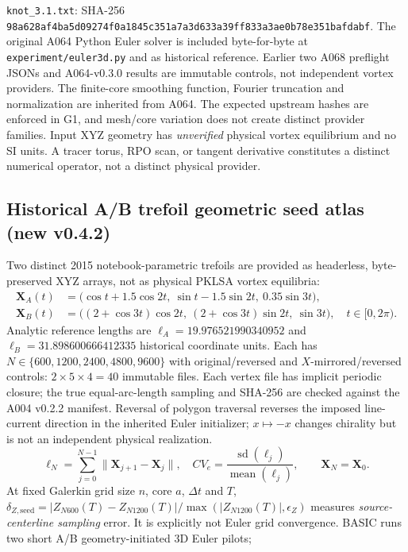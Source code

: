 \documentclass[11pt,a4paper]{article}
\begin{document}
\texttt{knot\_3.1.txt}: SHA-256 \texttt{98a628af4ba5d09274f0a1845c351a7a3d633a39ff833a3ae0b78e351bafdabf}. The original A064 Python Euler solver is included byte-for-byte at \texttt{experiment/euler3d.py} and as historical reference. Earlier two A068 preflight JSONs and A064-v0.3.0 results are immutable controls, not independent vortex providers. The finite-core smoothing function, Fourier truncation and normalization are inherited from A064. The expected upstream hashes are enforced in G1, and mesh/core variation does not create distinct provider families. Input XYZ geometry has \emph{unverified} physical vortex equilibrium and no SI units. A tracer torus, RPO scan, or tangent derivative constitutes a distinct numerical operator, not a distinct physical provider.

\subsection*{Historical A/B trefoil geometric seed atlas (new v0.4.2)}
Two distinct 2015 notebook-parametric trefoils are provided as headerless,
byte-preserved XYZ arrays, not as physical PKLSA vortex equilibria:
\begin{align}
\mathbf X_A(t)&=\bigl(\cos t+1.5\cos2t,\ \sin t-1.5\sin2t,\ 0.35\sin3t\bigr),\\
\mathbf X_B(t)&=\bigl((2+\cos3t)\cos2t,\ (2+\cos3t)\sin2t,\ \sin3t\bigr),\quad t\in[0,2\pi).
\end{align}
Analytic reference lengths are $\ell_A=19.976521990340952$ and
$\ell_B=31.898600666412335$ historical coordinate units. Each has
$N\in\{600,1200,2400,4800,9600\}$ with original/reversed and
$X$-mirrored/reversed controls: $2\times5\times4=40$ immutable files.
Each vertex file has implicit periodic closure; the true equal-arc-length
sampling and SHA-256 are checked against the A004 v0.2.2 manifest. Reversal
of polygon traversal reverses the imposed line-current direction in the
inherited Euler initializer; $x\mapsto-x$ changes chirality but is not
an independent physical realization.
\begin{equation}
 \ell_N=\sum_{j=0}^{N-1}\|\mathbf X_{j+1}-\mathbf X_j\|,\quad
 CV_e=\frac{\operatorname{sd}(\ell_j)}{\operatorname{mean}(\ell_j)},
 \qquad \mathbf X_N=\mathbf X_0.
\end{equation}
At fixed Galerkin grid size $n$, core $a$, $\Delta t$ and $T$,
$\delta_{Z,\mathrm{seed}}=|Z_{N600}(T)-Z_{N1200}(T)|/
\max(|Z_{N1200}(T)|,\epsilon_Z)$ measures \emph{source-centerline sampling}
error. It is explicitly not Euler grid convergence. BASIC runs two short A/B geometry-initiated 3D Euler pilots;
\end{document}
